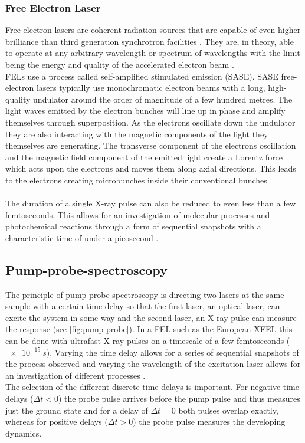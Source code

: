 \documentclass[10pt,a4paper, bibliography=totoc]{scrartcl}
\begin{document}
\subsubsection{Free Electron Laser}
Free-electron lasers are coherent radiation sources that are capable of even higher brilliance than third generation synchrotron facilities \cite{2}. They are, in theory, able to operate at any arbitrary wavelength or spectrum of wavelengths with the limit being the energy and quality of the accelerated electron beam \cite{2}. \\
FELs use a process called self-amplified stimulated emission (SASE). SASE free-electron lasers typically use monochromatic electron beams with a long, high-quality undulator around the order of magnitude of a few hundred metres. The light waves emitted by the electron bunches will line up in phase and amplify themselves through superposition. As the electrons oscillate down the undulator they are also interacting with the magnetic components of the light they themselves are generating. The transverse component of the electrons oscillation and the magnetic field component of the emitted light create a Lorentz force which acts upon the electrons and moves them along axial directions. This leads to the electrons creating microbunches inside their conventional bunches \cite{1}.\\\\
The duration of a single X-ray pulse can also be reduced to even less than a few femtoseconds. This allows for an investigation of molecular processes and photochemical reactions through a form of sequential snapshots with a characteristic time of under a picosecond \cite{1}.

\subsection{Pump-probe-spectroscopy}
The principle of pump-probe-spectroscopy is directing two lasers at the same sample with a certain time delay so that the first laser, an optical laser, can excite the system in some way and the second laser, an X-ray pulse can measure the response (see \autoref{fig:pump probe}). In a FEL such as the European XFEL this can be done with ultrafast X-ray pulses on a timescale of a few femtoseconds ($\qty{e-15}{s}$). Varying the time delay allows for a series of sequential snapshots of the process observed and varying the wavelength of the excitation laser allows for an investigation of different processes \cite{0}.\\
The selection of the different discrete time delays is important. For negative time delays ($\Delta t<0$) the probe pulse arrives before the pump pulse and thus measures just the ground state and for a delay of $\Delta t=0$ both pulses overlap exactly, whereas for positive delays ($\Delta t>0$) the probe pulse measures the developing dynamics.
\end{document}
